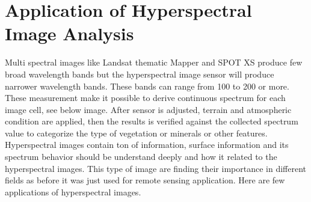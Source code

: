 \documentclass[document.tex]{subfiles}
\begin{document}
\section{Application of Hyperspectral Image Analysis}
Multi spectral images like Landsat thematic Mapper and SPOT XS produce few broad wavelength bands but the hyperspectral image sensor will produce narrower wavelength bands. These bands can range from 100 to 200 or more. These measurement make it possible to derive continuous spectrum for each image cell, see below image. After sensor is adjusted, terrain and atmospheric condition are applied, then the results is verified against the collected spectrum value to categorize the type of vegetation or minerals or other features. Hyperspectral images contain ton of information, surface information and its spectrum behavior should be understand deeply and how it related to the hyperspectral images. This type of image are finding their importance in different fields as before it was just used for remote sensing application. Here are few applications of hyperspectral images.
\end{document}

